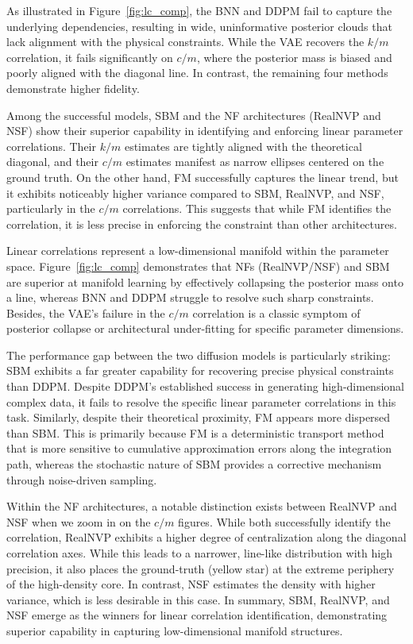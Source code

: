 As illustrated in Figure~\ref{fig:lc_comp}, the \ac{BNN} and \ac{DDPM} fail to capture the underlying dependencies, resulting in wide, uninformative posterior clouds that lack alignment with the physical constraints. While the \ac{VAE} recovers the $k/m$ correlation, it fails significantly on $c/m$, where the posterior mass is biased and poorly aligned with the diagonal line. In contrast, the remaining four methods demonstrate higher fidelity. 

Among the successful models, \ac{SBM} and the \ac{NF} architectures (\ac{RealNVP} and \ac{NSF}) show their superior capability in identifying and enforcing linear parameter correlations. Their $k/m$ estimates are tightly aligned with the theoretical diagonal, and their $c/m$ estimates manifest as narrow ellipses centered on the ground truth. On the other hand, \ac{FM} successfully captures the linear trend, but it exhibits noticeably higher variance compared to \ac{SBM}, \ac{RealNVP}, and \ac{NSF}, particularly in the $c/m$ correlations. This suggests that while \ac{FM} identifies the correlation, it is less precise in enforcing the constraint than other architectures.

Linear correlations represent a low-dimensional manifold within the parameter space. Figure~\ref{fig:lc_comp} demonstrates that \acp{NF} (\ac{RealNVP}/\ac{NSF}) and \ac{SBM} are superior at manifold learning by effectively collapsing the posterior mass onto a line, whereas \ac{BNN} and \ac{DDPM} struggle to resolve such sharp constraints. Besides, the \ac{VAE}’s failure in the $c/m$ correlation is a classic symptom of posterior collapse or architectural under-fitting for specific parameter dimensions. 

The performance gap between the two diffusion models is particularly striking: \ac{SBM} exhibits a far greater capability for recovering precise physical constraints than \ac{DDPM}. Despite \ac{DDPM}'s established success in generating high-dimensional complex data, it fails to resolve the specific linear parameter correlations in this task.
Similarly, despite their theoretical proximity, \ac{FM} appears more dispersed than \ac{SBM}. This is primarily because \ac{FM} is a deterministic transport method that is more sensitive to cumulative approximation errors along the integration path, whereas the stochastic nature of \ac{SBM} provides a corrective mechanism through noise-driven sampling.

Within the \ac{NF} architectures, a notable distinction exists between \ac{RealNVP} and \ac{NSF} when we zoom in on the $c/m$ figures. While both successfully identify the correlation, \ac{RealNVP} exhibits a higher degree of centralization along the diagonal correlation axes. While this leads to a narrower, line-like distribution with high precision, it also places the ground-truth (yellow star) at the extreme periphery of the high-density core. In contrast, \ac{NSF} estimates the density with higher variance, which is less desirable in this case. In summary, \ac{SBM}, \ac{RealNVP}, and \ac{NSF} emerge as the winners for linear correlation identification, demonstrating superior capability in capturing low-dimensional manifold structures.


